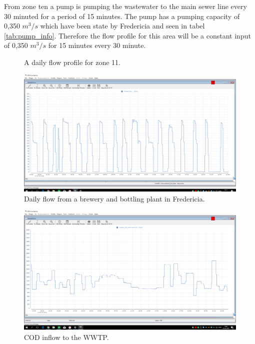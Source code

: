 From zone ten a pump is pumping the wastewater to the main sewer line every 30 minuted for a period of 15 minutes. The pump has a pumping capacity of 0,350 $m^3/s$ which have been state by Fredericia and seen in tabel \ref{tab:pump_info}. Therefore the flow profile for this area will be a constant input of 0,350 $m^3/s$ for 15 minutes every 30 minute. 

\begin{figure}[H]
\centering

\caption{A daily flow profile for zone 11.}
\label{fig:APP_flow_profile_zone11}
\end{figure} 


\begin{figure}[H]
	\centering
	\includegraphics[width=0.95\textheight, angle=-90]{report/appendix/figures/Carlsberg_data.png}
	\caption{Daily flow from a brewery and bottling plant in Fredericia.}
	\label{fig:Carlsberg_data}
\end{figure}

\begin{figure}[H]
	\centering
	\includegraphics[width=0.95\textheight, angle=-90]{report/appendix/figures/COD_data.png}
	\caption{COD inflow to the WWTP.}
	\label{fig:COD_data}
\end{figure}

